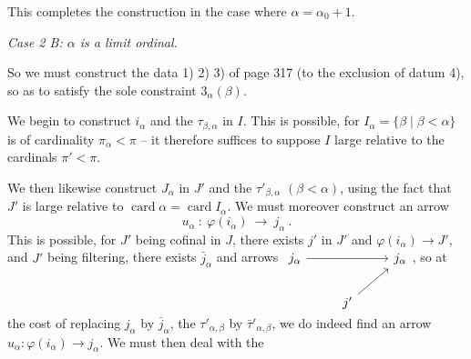 \documentclass[11pt]{article}
\newcommand{\msp}[1]{\marginpar{\footnotesize [#1]}}
\newcommand{\card}{\operatorname{card}}
\begin{document}
This completes the construction in the case where $\alpha=\alpha_0+1$.

\textit{Case 2 B: $\alpha$ is a limit ordinal.}

So we must construct the data 1) 2) 3) of page 317 (to the exclusion of datum 4), so as to satisfy the sole constraint $3_\alpha(\beta)$.

We begin to construct $i_\alpha$ and the $\tau_{\beta,\alpha}$ in $I$. This is possible, for $I_\alpha=\{\beta\mid\beta<\alpha\}$ is of cardinality $\pi_\alpha<\pi$ – it therefore suffices to suppose $I$ large relative to the cardinals $\pi'<\pi$.

We then likewise construct $J_\alpha$ in $J'$ and the $\tau'_{\beta,\alpha}$ $(\beta<\alpha)$, using the %
\msp{page 328}
fact that $J'$ is large relative to $\card\alpha=\card I_\alpha$. We must moreover construct an arrow
\[
u_\alpha\ :\ \varphi(i_\alpha)\ \longrightarrow\ j_\alpha\ .
\]
This is possible, for $J'$ being cofinal in $J$, there exists $j'$ in $J'$ and $\varphi(i_\alpha)\longrightarrow J'$, and $J'$ being filtering, there exists $\bar{j}_\alpha$ and arrows %
$\begin{tikzcd}[ampersand replacement=\&, baseline=(\tikzcdmatrixname-1-1.base)]
j_\alpha \arrow[rr] \& \& j_\alpha \\
\& j' \arrow[ur] \&
\end{tikzcd}$, so at the cost of replacing $j_\alpha$ by $\bar{j}_\alpha$, the $\tau'_{\alpha,\beta}$ by $\bar{\tau}'_{\alpha,\beta}$, we do indeed find an arrow $u_\alpha:\varphi(i_\alpha)\longrightarrow j_\alpha$. We must then deal with the %
\end{document}
